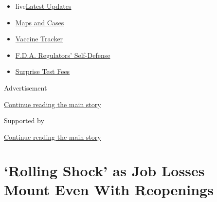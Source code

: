 \begin{itemize}
\tightlist
\item
  live\href{https://www.nytimes3xbfgragh.onion/2020/09/12/world/covid-19-coronavirus.html?name=styln-coronavirus-markets\&region=TOP_BANNER\&block=storyline_menu_recirc\&action=click\&pgtype=Article\&impression_id=42c81111-f52e-11ea-bd9d-0b405bc82d81\&variant=undefined}{Latest
  Updates}
\item
  \href{https://www.nytimes3xbfgragh.onion/interactive/2020/us/coronavirus-us-cases.html?name=styln-coronavirus-markets\&region=TOP_BANNER\&block=storyline_menu_recirc\&action=click\&pgtype=Article\&impression_id=42c81112-f52e-11ea-bd9d-0b405bc82d81\&variant=undefined}{Maps
  and Cases}
\item
  \href{https://www.nytimes3xbfgragh.onion/interactive/2020/science/coronavirus-vaccine-tracker.html?name=styln-coronavirus-markets\&region=TOP_BANNER\&block=storyline_menu_recirc\&action=click\&pgtype=Article\&impression_id=42c81113-f52e-11ea-bd9d-0b405bc82d81\&variant=undefined}{Vaccine
  Tracker}
\item
  \href{https://www.nytimes3xbfgragh.onion/2020/09/10/us/politics/fda-coronavirus-vaccine.html?name=styln-coronavirus-markets\&region=TOP_BANNER\&block=storyline_menu_recirc\&action=click\&pgtype=Article\&impression_id=42c83820-f52e-11ea-bd9d-0b405bc82d81\&variant=undefined}{F.D.A.
  Regulators' Self-Defense}
\item
  \href{https://www.nytimes3xbfgragh.onion/2020/09/09/upshot/coronavirus-surprise-test-fees.html?name=styln-coronavirus-markets\&region=TOP_BANNER\&block=storyline_menu_recirc\&action=click\&pgtype=Article\&impression_id=42c83821-f52e-11ea-bd9d-0b405bc82d81\&variant=undefined}{Surprise
  Test Fees}
\end{itemize}

Advertisement

\protect\hyperlink{after-top}{Continue reading the main story}

Supported by

\protect\hyperlink{after-sponsor}{Continue reading the main story}

\hypertarget{rolling-shock-as-job-losses-mount-even-with-reopenings}{%
\section{`Rolling Shock' as Job Losses Mount Even With
Reopenings}\label{rolling-shock-as-job-losses-mount-even-with-reopenings}}

